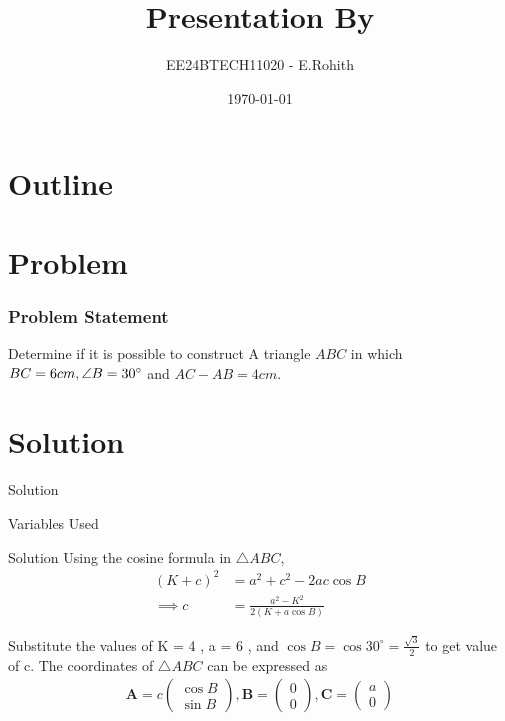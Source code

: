 \documentclass{beamer}
\title{Presentation By}
\author{EE24BTECH11020 - E.Rohith}
\date{\today}
\theoremstyle{remark}
\newcommand{\myvec}[1]{\ensuremath{\begin{pmatrix}#1\end{pmatrix}}}
\let\vec\mathbf
\numberwithin{equation}{section}
\begin{document}
\begin{frame}
\titlepage
\end{frame}
\section*{Outline}
\begin{frame}
\tableofcontents
\end{frame}
\section{Problem}
\begin{frame}
\frametitle{Problem Statement}
Determine if it is possible to construct  A triangle $ABC$  in which $BC = 6cm, \angle B =30\degree$ and $AC - AB=4cm$.
\end{frame}
\section{Solution}
\begin{frame}{Solution}
\begin{table}[h!]    
  \centering
  
  \caption{Variables Used}
  
\end{table}
\end{frame}
\begin{frame}{Solution}
    Using the cosine formula in  $\triangle ABC$,
\begin{align}
    (K + c)^2 &= a^2 + c^2 - 2ac \cos B \\
    \implies c &= \frac{a^2 - K^2}{2(K + a \cos B)}
\end{align}

Substitute the values of  K = 4 ,  a = 6 , and $\cos B = \cos 30^\circ = \frac{\sqrt{3}}{2}$ to get value of c.
The coordinates of $\triangle ABC$ can be expressed as
\begin{align}
    \vec{A} = c \myvec{\cos{B} \\ \sin{B}}, 
    \vec{B} = \myvec{0 \\ 0}, 
    \vec{C} = \myvec{a \\ 0}   
\end{align}

\end{frame}
\end{document}
